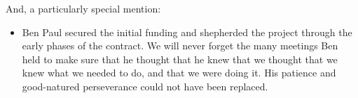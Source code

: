 \noindent
And, a particularly special mention:

\begin{itemize}
\item Ben Paul secured the initial funding and shepherded the project
      through the early phases of the contract.
      We will never forget the many meetings Ben held to make sure that
      he thought that he knew that we thought that we knew what we needed
      to do, and that we were doing it.
      His patience and good-natured perseverance could not have been
      replaced.
\end{itemize}
